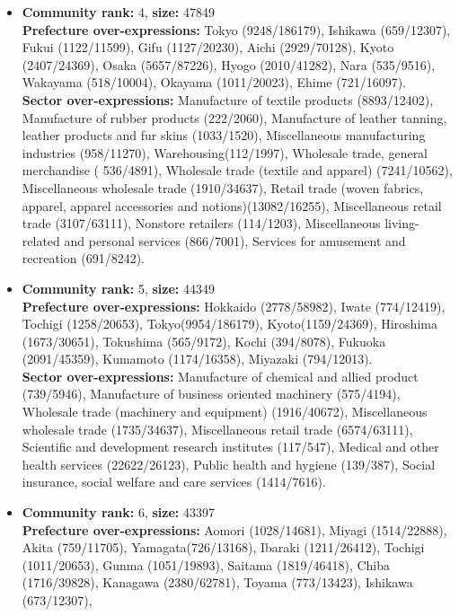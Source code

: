\documentclass[pre,floatfix,twocolumn,showpacs,a4paper,nofootinbib]{revtex4}
\begin{document}
\begin {itemize}
Goods rental and leasing (567/6910), Professional services, N.E.C.(1127/19393), Technical services, N.E.C.(2609/26216),
Miscellaneous business services (1887/19963), Foreign governments and international agencies in Japan (7/20).
\item {\bf Community rank:} 4, {\bf size:} 47849\\
{\bf Prefecture over-expressions:} Tokyo (9248/186179), Ishikawa (659/12307), Fukui (1122/11599), Gifu (1127/20230),
Aichi (2929/70128), Kyoto (2407/24369), Osaka (5657/87226), Hyogo (2010/41282), Nara (535/9516), Wakayama (518/10004),
Okayama (1011/20023), Ehime (721/16097).\\
{\bf Sector over-expressions:} Manufacture of textile products (8893/12402), Manufacture of rubber products (222/2060),
Manufacture of leather tanning, leather products and fur skins (1033/1520), Miscellaneous manufacturing industries (958/11270),
Warehousing(112/1997), Wholesale trade, general merchandise ( 536/4891), Wholesale trade (textile and apparel) (7241/10562),
Miscellaneous wholesale trade (1910/34637), Retail trade (woven fabrics, apparel, apparel accessories and notions)(13082/16255),
Miscellaneous retail trade (3107/63111), Nonstore retailers (114/1203), Miscellaneous living-related and personal services (866/7001),
Services for amusement and recreation (691/8242).
\item {\bf Community rank:} 5, {\bf size:} 44349\\
{\bf Prefecture over-expressions:} Hokkaido (2778/58982), Iwate (774/12419), Tochigi (1258/20653), Tokyo(9954/186179),
 Kyoto(1159/24369), Hiroshima (1673/30651), Tokushima (565/9172),  Kochi (394/8078), Fukuoka (2091/45359), Kumamoto (1174/16358),
 Miyazaki (794/12013).\\
 {\bf Sector over-expressions:} Manufacture of chemical and allied product (739/5946), Manufacture of business oriented machinery (575/4194),
 Wholesale trade (machinery and equipment) (1916/40672), Miscellaneous wholesale trade (1735/34637),  Miscellaneous retail trade (6574/63111),
 Scientific and development research institutes (117/547), Medical and other health services (22622/26123), Public health and hygiene (139/387),
 Social insurance, social welfare and care services (1414/7616).
 \item {\bf Community rank:} 6, {\bf size:} 43397\\
 {\bf Prefecture over-expressions:} Aomori (1028/14681), Miyagi (1514/22888), Akita (759/11705),  Yamagata(726/13168), Ibaraki (1211/26412),
 Tochigi (1011/20653), Gunma (1051/19893), Saitama (1819/46418), Chiba (1716/39828), Kanagawa (2380/62781), Toyama (773/13423), Ishikawa (673/12307),

\end{itemize}
\end{document}

